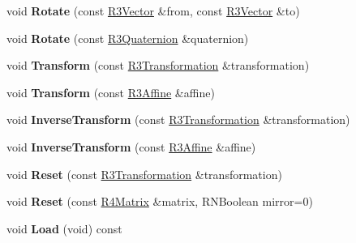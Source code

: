 \begin{DoxyCompactItemize}
\item 
void {\bfseries Rotate} (const \hyperlink{class_r3_vector}{R3\+Vector} \&from, const \hyperlink{class_r3_vector}{R3\+Vector} \&to)\hypertarget{class_r3_affine_a949bba0e1024a953f247897ed1662e38}{}\label{class_r3_affine_a949bba0e1024a953f247897ed1662e38}

\item 
void {\bfseries Rotate} (const \hyperlink{class_r3_quaternion}{R3\+Quaternion} \&quaternion)\hypertarget{class_r3_affine_a161d1a09fb2788f988f1845a54ae3414}{}\label{class_r3_affine_a161d1a09fb2788f988f1845a54ae3414}

\item 
void {\bfseries Transform} (const \hyperlink{class_r3_transformation}{R3\+Transformation} \&transformation)\hypertarget{class_r3_affine_a46ab8262e4988d11797be68d4b1b2852}{}\label{class_r3_affine_a46ab8262e4988d11797be68d4b1b2852}

\item 
void {\bfseries Transform} (const \hyperlink{class_r3_affine}{R3\+Affine} \&affine)\hypertarget{class_r3_affine_a5cfef547dc6c12e77eca85844b39d4c2}{}\label{class_r3_affine_a5cfef547dc6c12e77eca85844b39d4c2}

\item 
void {\bfseries Inverse\+Transform} (const \hyperlink{class_r3_transformation}{R3\+Transformation} \&transformation)\hypertarget{class_r3_affine_adf00889b4e39e0062b672bab1f5b594e}{}\label{class_r3_affine_adf00889b4e39e0062b672bab1f5b594e}

\item 
void {\bfseries Inverse\+Transform} (const \hyperlink{class_r3_affine}{R3\+Affine} \&affine)\hypertarget{class_r3_affine_a869c6829406ef32fc502676005fbcc7b}{}\label{class_r3_affine_a869c6829406ef32fc502676005fbcc7b}

\item 
void {\bfseries Reset} (const \hyperlink{class_r3_transformation}{R3\+Transformation} \&transformation)\hypertarget{class_r3_affine_a4c10f6219605516e6d032896c245934c}{}\label{class_r3_affine_a4c10f6219605516e6d032896c245934c}

\item 
void {\bfseries Reset} (const \hyperlink{class_r4_matrix}{R4\+Matrix} \&matrix, R\+N\+Boolean mirror=0)\hypertarget{class_r3_affine_a8ca545eed97aa3282220d61b29fbdbea}{}\label{class_r3_affine_a8ca545eed97aa3282220d61b29fbdbea}

\item 
void {\bfseries Load} (void) const \hypertarget{class_r3_affine_aecf172c20ebd7a1697104258ba0370d1}{}\label{class_r3_affine_aecf172c20ebd7a1697104258ba0370d1}


\end{DoxyCompactItemize}
